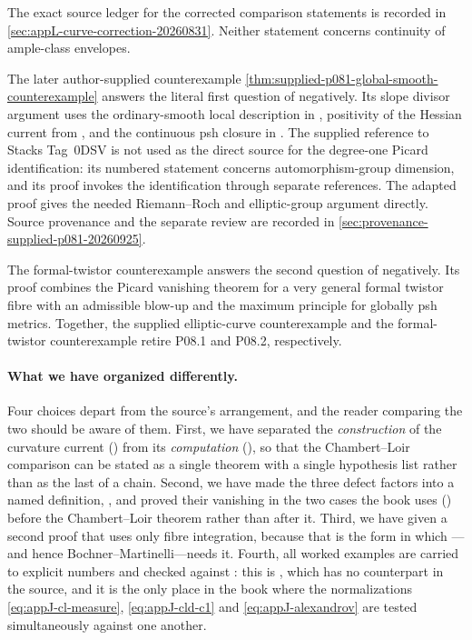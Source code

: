 The exact source ledger for the corrected comparison statements is recorded
in \cref{sec:appL-curve-correction-20260831}.  Neither statement concerns
continuity of ample-class envelopes.

The later author-supplied counterexample
\cref{thm:supplied-p081-global-smooth-counterexample} answers the literal
first question of \cite[Remark~17.8.10]{CLD25} negatively.  Its slope
divisor argument uses the ordinary-smooth local description in
\cite[Proposition~15.1.1(b) and Corollary~15.1.2]{CLD25}, positivity of the
Hessian current from \cite[Proposition~8.3.1(a) and
Theorem~15.7.1]{CLD25}, and the continuous psh closure in
\cite[Definition~8.1.7 and Propositions~8.1.9, 8.1.11]{CLD25}.  The
supplied reference to Stacks Tag~0DSV is not used as the direct source for
the degree-one Picard identification: its numbered statement concerns
automorphism-group dimension, and its proof invokes the identification
through separate references. The adapted proof gives the needed
Riemann--Roch and elliptic-group argument directly. Source
provenance and the separate review are recorded in
\cref{sec:provenance-supplied-p081-20260925}.

The formal-twistor counterexample
 answers the second question
of \cite[Remark~17.8.10]{CLD25} negatively.  Its proof combines the Picard
vanishing theorem for a very general formal twistor fibre with an admissible
blow-up and the maximum principle for globally psh metrics.
Together, the supplied elliptic-curve counterexample and the formal-twistor
counterexample retire P08.1 and P08.2, respectively.

\paragraph{What we have organized differently.}
Four choices depart from the source's arrangement, and the reader comparing
the two should be aware of them.  First, we have separated the
\emph{construction} of the curvature current
() from its \emph{computation}
(), so that the Chambert--Loir comparison can be
stated as a single theorem with a single hypothesis list rather than as the
last of a chain.  Second, we have made the three defect factors into a named
definition, , and proved their vanishing in the two
cases the book uses ()
before the Chambert--Loir theorem rather than after it.  Third, we have
given  a second proof that uses only fibre
integration, because that is the form in which
---and hence Bochner--Martinelli---needs
it.  Fourth, all worked examples are carried to explicit numbers and checked
against : this is , which has no
counterpart in the source, and it is the only place in the book where the
normalizations \eqref{eq:appJ-cl-measure}, \eqref{eq:appJ-cld-c1} and
\eqref{eq:appJ-alexandrov} are tested simultaneously against one another.

